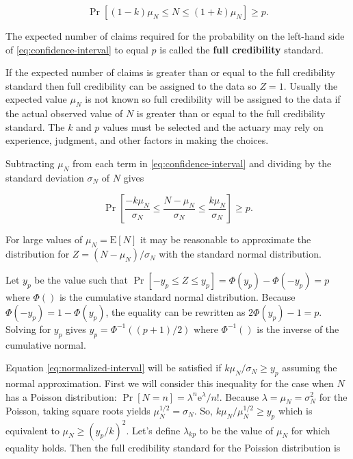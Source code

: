 \documentclass[]{book}
\theoremstyle{definition}
\theoremstyle{definition}
\theoremstyle{definition}
\theoremstyle{remark}
\begin{document}
\begin{equation}
\Pr[(1-k)\mu_N\leq N \leq(1+k)\mu_N] \geq p.
\label{eq:confidence-interval}
\end{equation}

The expected number of claims required for the probability on the
left-hand side of \eqref{eq:confidence-interval} to equal \(p\) is called
the \textbf{full credibility} standard.

If the expected number of claims is greater than or equal to the full
credibility standard then full credibility can be assigned to the data
so \(Z=1\). Usually the expected value \(\mu_N\) is not known so full
credibility will be assigned to the data if the actual observed value of
\(N\) is greater than or equal to the full credibility standard. The
\(k\) and \(p\) values must be selected and the actuary may rely on
experience, judgment, and other factors in making the choices.

Subtracting \(\mu_N\) from each term in \eqref{eq:confidence-interval} and
dividing by the standard deviation \(\sigma_N\) of \(N\) gives

\begin{equation}
\Pr\left[\frac{-k\mu_N}{\sigma_N}\leq \frac{N-\mu_N}{\sigma_N} \leq \frac{k\mu_N}{\sigma_N}\right] \geq p.
\label{eq:normalized-interval}
\end{equation}

For large values of \(\mu_N=\mathrm{E}[N]\) it may be reasonable to
approximate the distribution for \(Z=(N-\mu_N)/\sigma_N\) with the
standard normal distribution.

Let \(y_p\) be the value such that
\(\Pr[-y_p\leq Z \leq y_p]=\Phi(y_p)-\Phi(-y_p)=p\) where \(\Phi( )\) is
the cumulative standard normal distribution. Because
\(\Phi(-y_p)=1-\Phi(y_p)\), the equality can be rewritten as
\(2\Phi(y_p)-1=p\). Solving for \(y_p\) gives \(y_p=\Phi^{-1}((p+1)/2)\)
where \(\Phi^{-1}( )\) is the inverse of the cumulative normal.

Equation \eqref{eq:normalized-interval} will be satisfied if
\(k\mu_N/\sigma_N \geq y_p\) assuming the normal approximation. First we
will consider this inequality for the case when \(N\) has a Poisson
distribution: \(\Pr[N=n] = \lambda^n\textrm{e}^{\lambda}/n!\). Because
\(\lambda=\mu_N=\sigma_N^2\) for the Poisson, taking square roots yields
\(\mu_N^{1/2}=\sigma_N\). So, \(k\mu_N/\mu_N^{1/2} \geq y_p\) which is
equivalent to \(\mu_N \geq (y_p/k)^2\). Let's define \(\lambda_{kp}\) to
be the value of \(\mu_N\) for which equality holds. Then the full
credibility standard for the Poission distribution is
\end{document}
